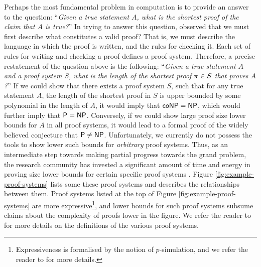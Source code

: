 \documentclass[11pt]{article}
\begin{document}
Perhaps the most fundamental problem in computation is to provide an answer to the question: ``\textit{Given a true statement $A$, what is the shortest proof of the claim that $A$ is true?}''
In trying to answer this question, \citet{cook1979relative} observed that we must first describe what constitutes a valid proof?
That is, we must describe the language in which the proof is written, and the rules for checking it.
Each set of rules for writing and checking a proof defines a proof system.
Therefore, a precise restatement of the question above is the following:  ``\textit{Given a true statement $A$ and a proof system $S$, what is the length of the shortest proof $\pi \in S$ that proves $A$?}''
If we could show that there exists a proof system $S$, such that for any true statement $A$, the length of the shortest proof in $S$ is upper bounded by some polynomial in the length of $A$, it would imply that $\mathsf{coNP} = \mathsf{NP}$, which would further imply that $\mathsf{P} = \mathsf{NP}$.
Conversely, if we could show large proof size lower bounds for $A$ in all proof systems, it would lead to a formal proof of the widely believed conjecture that $\mathsf{P} \neq \mathsf{NP}$.
Unfortunately, we currently do not possess the tools to show lower such bounds for \emph{arbitrary} proof systems.
Thus, as an intermediate step towards making partial progress towards the grand problem, the research community has invested a significant amount of time and energy in proving size lower bounds for certain specific proof systems \citep{blake1937canonical,razborov1998lower, impagliazzo1999lower, alekhnovich2001lower, buss1999linear}.
 Figure \ref{fig:example-proof-systems} lists some these proof systems and describes the relationships between them.
Proof systems listed at the top of Figure \ref{fig:example-proof-systems} are more expressive\footnote{Expressiveness is formalised by the notion of $p$-simulation, and we refer the reader to \citep[Definition 1.6]{ProofComplexityLecNotes} for more details.}, and lower bounds for such proof systems subsume claims about the complexity of proofs lower in the figure.
We refer the reader to \citep{krajicek2019proof, ProofComplexityLecNotesPaul} for more details on the definitions of the various proof systems.\par
\end{document}
